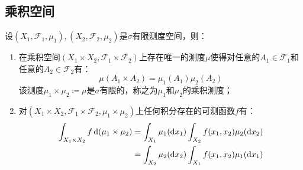 \subsection{乘积空间}
\begin{theorem}
	设$(X_1,\mathscr{F}_1,\mu_1),(X_2,\mathscr{F}_2,\mu_2)$是$\sigma$有限测度空间，则：
	\begin{enumerate}
		\item 在乘积空间$(X_1\times X_2,\mathscr{F}_1\times \mathscr{F}_2)$上存在唯一的测度$\mu$使得对任意的$A_1\in\mathscr{F}_1$和任意的$A_2\in\mathscr{F}_2$有：
		\begin{equation*}
			\mu(A_1\times A_2)=\mu_1(A_1)\mu_2(A_2)
		\end{equation*}
		该测度$\mu_1\times\mu_2\coloneq\mu$是$\sigma$有限的，称之为$\mu_1$和$\mu_2$的乘积测度；
		\item 对$(X_1\times X_2,\mathscr{F}_1\times \mathscr{F}_2,\mu_1\times\mu_2)$上任何积分存在的可测函数$f$有：
		\begin{align*}
			\int_{X_1\times X_2}f\mathop{}\!\mathrm{d}(\mu_1\times\mu_2)&=\int_{X_1}\mu_1(\mathop{}\!\mathrm{d} x_1)\int_{X_2}f(x_1,x_2)\mu_2(\mathop{}\!\mathrm{d} x_2) \\
			&=\int_{X_2}\mu_2(\mathop{}\!\mathrm{d} x_2)\int_{X_1}f(x_1,x_2)\mu_1(\mathop{}\!\mathrm{d} x_1)
		\end{align*}
	\end{enumerate}
\end{theorem}